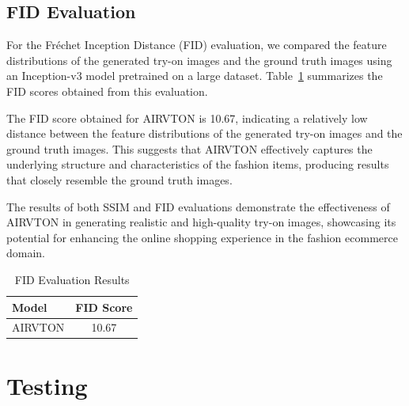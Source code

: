 \subsection{FID Evaluation}

For the Fréchet Inception Distance (FID) evaluation, we compared the feature distributions of the generated try-on images and the ground truth images using an Inception-v3 model pretrained on a large dataset. Table~\ref{tab:fid_results} summarizes the FID scores obtained from this evaluation.

The FID score obtained for AIRVTON is 10.67, indicating a relatively low distance between the feature distributions of the generated try-on images and the ground truth images. This suggests that AIRVTON effectively captures the underlying structure and characteristics of the fashion items, producing results that closely resemble the ground truth images.

The results of both SSIM and FID evaluations demonstrate the effectiveness of AIRVTON in generating realistic and high-quality try-on images, showcasing its potential for enhancing the online shopping experience in the fashion ecommerce domain.

\begin{table}[h!]
    \caption{FID Evaluation Results}
    \label{tab:fid_results}
    \centering
    \begin{tabular}{lc}
      \toprule
      \textbf{Model} & \textbf{FID Score} \\
      \midrule
      AIRVTON & 10.67 \\
      \bottomrule
    \end{tabular}
\end{table}

\section{Testing}

